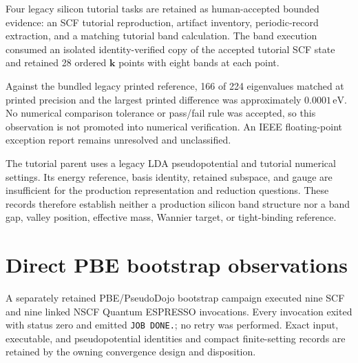 
Four legacy silicon tutorial tasks are retained as human-accepted bounded
evidence: an SCF tutorial reproduction, artifact inventory, periodic-record
extraction, and a matching tutorial band calculation. The band execution
consumed an isolated identity-verified copy of the accepted tutorial SCF state
and retained 28 ordered $\mathbf k$ points with eight bands at each point.

Against the bundled legacy printed reference, 166 of 224 eigenvalues matched at
printed precision and the largest printed difference was approximately
$0.0001\,\mathrm{eV}$. No numerical comparison tolerance or pass/fail rule was
accepted, so this observation is not promoted into numerical verification. An
IEEE floating-point exception report remains unresolved and unclassified.

The tutorial parent uses a legacy LDA pseudopotential and tutorial numerical
settings. Its energy reference, basis identity, retained subspace, and gauge are
insufficient for the production representation and reduction questions. These
records therefore establish neither a production silicon band structure nor a
band gap, valley position, effective mass, Wannier target, or tight-binding
reference.

\section{Direct PBE bootstrap observations}



A separately retained PBE/PseudoDojo bootstrap campaign executed nine SCF and
nine linked NSCF Quantum ESPRESSO invocations. Every invocation exited with
status zero and emitted \texttt{JOB DONE.}; no retry was performed. Exact input,
executable, and pseudopotential identities and compact finite-setting records
are retained by the owning convergence design and disposition.


